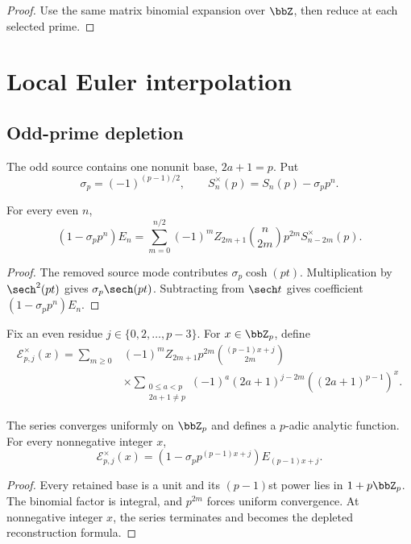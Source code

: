 \begin{proof}
Use the same matrix binomial expansion over $\bbZ$, then reduce at each selected prime.
\end{proof}

\section{Local Euler interpolation}

\subsection{Odd-prime depletion}
The odd source contains one nonunit base, $2a+1=p$. Put
\[
 \sigma_p=(-1)^{(p-1)/2},\qquad S_n^\times(p)=S_n(p)-\sigma_pp^n.
\]

\begin{theorem}
For every even $n$,
\[
 \boxed{(1-\sigma_pp^n)E_n=\sum_{m=0}^{n/2}(-1)^mZ_{2m+1}\binom n{2m}p^{2m}S_{n-2m}^\times(p).}
\]
\end{theorem}

\begin{proof}
The removed source mode contributes $\sigma_p\cosh(pt)$. Multiplication by $\sech^2(pt)$ gives $\sigma_p\sech(pt)$. Subtracting from $\sech t$ gives coefficient $(1-\sigma_pp^n)E_n$.
\end{proof}

Fix an even residue $j\in\{0,2,\ldots,p-3\}$. For $x\in\bbZ_p$, define
\[
 \begin{aligned}
 \mathscr E_{p,j}^\times(x)=\sum_{m\geq0}
 &(-1)^mZ_{2m+1}p^{2m}\binom{(p-1)x+j}{2m}\\
 &\times\sum_{\substack{0\leq a<p\\2a+1\neq p}}
 (-1)^a(2a+1)^{j-2m}\left((2a+1)^{p-1}\right)^x.
 \end{aligned}
\]

\begin{theorem}
The series converges uniformly on $\bbZ_p$ and defines a $p$-adic analytic function. For every nonnegative integer $x$,
\[
 \boxed{\mathscr E_{p,j}^\times(x)=\left(1-\sigma_pp^{(p-1)x+j}\right)E_{(p-1)x+j}.}
\]
\end{theorem}

\begin{proof}
Every retained base is a unit and its $(p-1)$st power lies in $1+p\bbZ_p$. The binomial factor is integral, and $p^{2m}$ forces uniform convergence. At nonnegative integer $x$, the series terminates and becomes the depleted reconstruction formula.
\end{proof}


